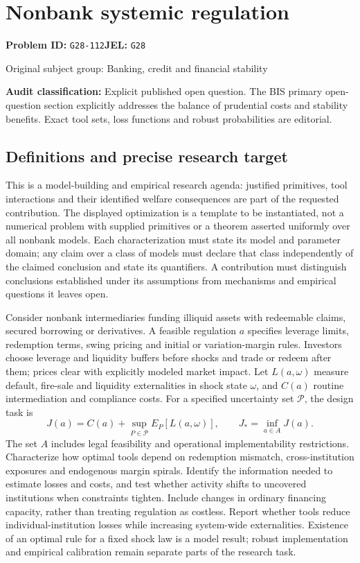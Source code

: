 \documentclass[11pt,a4paper]{article}
\begin{document}
\section*{Nonbank systemic regulation}
\textbf{Problem ID:} \texttt{G28-112}\quad \textbf{JEL:} \texttt{G28}\par
\label{problem:OP-0325}
{\sffamily\small\color{muted}Original subject group: Banking, credit and financial stability\par}
\label{definitions:problem:30007607}
\textbf{Audit classification:} Explicit published open question. The BIS primary open-question section explicitly addresses the balance of prudential costs and stability benefits. Exact tool sets, loss functions and robust probabilities are editorial.
\subsection*{Definitions and precise research target}
This is a model-building and empirical research agenda: justified primitives, tool interactions and their identified welfare consequences are part of the requested contribution. The displayed optimization is a template to be instantiated, not a numerical problem with supplied primitives or a theorem asserted uniformly over all nonbank models. Each characterization must state its model and parameter domain; any claim over a class of models must declare that class independently of the claimed conclusion and state its quantifiers. A contribution must distinguish conclusions established under its assumptions from mechanisms and empirical questions it leaves open.

Consider nonbank intermediaries funding illiquid assets with redeemable claims, secured borrowing or derivatives. A feasible regulation \(a\) specifies leverage limits, redemption terms, swing pricing and initial or variation-margin rules. Investors choose leverage and liquidity buffers before shocks and trade or redeem after them; prices clear with explicitly modeled market impact. Let \(L(a,\omega)\) measure default, fire-sale and liquidity externalities in shock state \(\omega\), and \(C(a)\) routine intermediation and compliance costs. For a specified uncertainty set \(\mathcal P\), the design task is
\[J(a)=C(a)+\sup_{P\in\mathcal P}E_P[L(a,\omega)],\qquad J_*=\inf_{a\in A}J(a).\]
The set \(A\) includes legal feasibility and operational implementability restrictions. Characterize how optimal tools depend on redemption mismatch, cross-institution exposures and endogenous margin spirals. Identify the information needed to estimate losses and costs, and test whether activity shifts to uncovered institutions when constraints tighten. Include changes in ordinary financing capacity, rather than treating regulation as costless. Report whether tools reduce individual-institution losses while increasing system-wide externalities. Existence of an optimal rule for a fixed shock law is a model result; robust implementation and empirical calibration remain separate parts of the research task.
\end{document}
